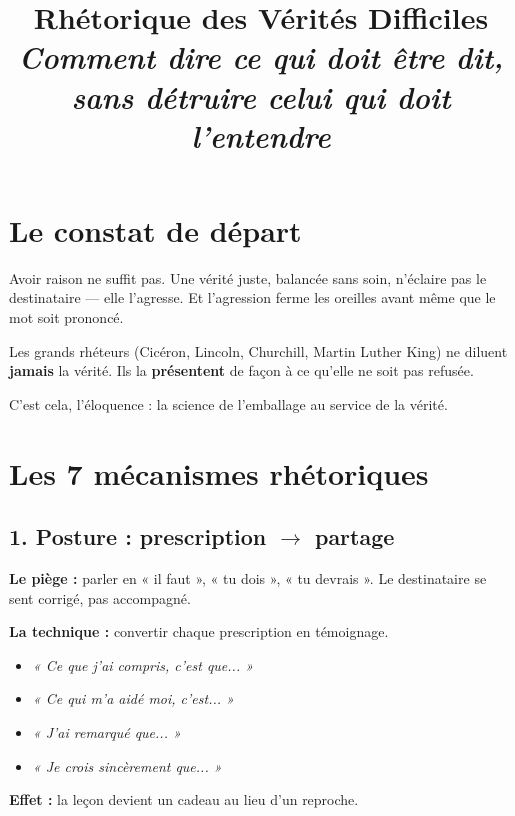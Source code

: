 \documentclass[11pt,a4paper]{article}
\title{\vspace{-2cm}\Huge\textbf{Rhétorique des Vérités Difficiles}\\[0.3em]\large\textit{Comment dire ce qui doit être dit, sans détruire celui qui doit l'entendre}}
\author{}
\date{}
\begin{document}
\maketitle
\vspace{-1.5cm}

\section*{Le constat de départ}

Avoir raison ne suffit pas. Une vérité juste, balancée sans soin, n'éclaire pas le destinataire — elle l'agresse. Et l'agression ferme les oreilles avant même que le mot soit prononcé.

Les grands rhéteurs (Cicéron, Lincoln, Churchill, Martin Luther King) ne diluent \textbf{jamais} la vérité. Ils la \textbf{présentent} de façon à ce qu'elle ne soit pas refusée.

\begin{tcolorbox}[colback=accent!10, colframe=accent, boxrule=1pt, arc=2pt]
C'est cela, l'éloquence : la science de l'emballage au service de la vérité.
\end{tcolorbox}

\section{Les 7 mécanismes rhétoriques}

\subsection{1. Posture : prescription $\rightarrow$ partage}

\textbf{Le piège :} parler en « il faut », « tu dois », « tu devrais ». Le destinataire se sent corrigé, pas accompagné.

\textbf{La technique :} convertir chaque prescription en témoignage.
\begin{itemize}[leftmargin=*, itemsep=2pt]
  \item \textit{« Ce que j'ai compris, c'est que... »}
  \item \textit{« Ce qui m'a aidé moi, c'est... »}
  \item \textit{« J'ai remarqué que... »}
  \item \textit{« Je crois sincèrement que... »}
\end{itemize}

\textbf{Effet :} la leçon devient un cadeau au lieu d'un reproche.
\end{document}
